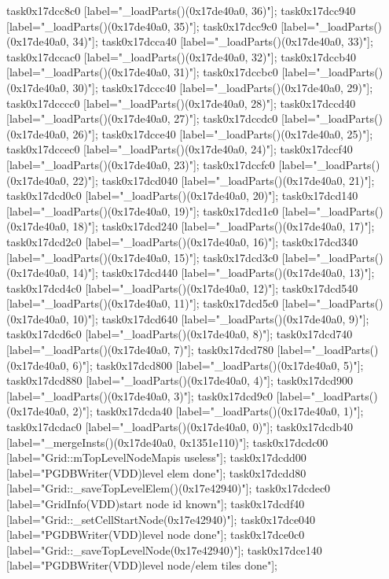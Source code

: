 {	task0x17dcc8c0 [label="_loadParts()(0x17de40a0, 36)"];
	task0x17dcc940 [label="_loadParts()(0x17de40a0, 35)"];
	task0x17dcc9c0 [label="_loadParts()(0x17de40a0, 34)"];
	task0x17dcca40 [label="_loadParts()(0x17de40a0, 33)"];
	task0x17dccac0 [label="_loadParts()(0x17de40a0, 32)"];
	task0x17dccb40 [label="_loadParts()(0x17de40a0, 31)"];
	task0x17dccbc0 [label="_loadParts()(0x17de40a0, 30)"];
	task0x17dccc40 [label="_loadParts()(0x17de40a0, 29)"];
	task0x17dcccc0 [label="_loadParts()(0x17de40a0, 28)"];
	task0x17dccd40 [label="_loadParts()(0x17de40a0, 27)"];
	task0x17dccdc0 [label="_loadParts()(0x17de40a0, 26)"];
	task0x17dcce40 [label="_loadParts()(0x17de40a0, 25)"];
	task0x17dccec0 [label="_loadParts()(0x17de40a0, 24)"];
	task0x17dccf40 [label="_loadParts()(0x17de40a0, 23)"];
	task0x17dccfc0 [label="_loadParts()(0x17de40a0, 22)"];
	task0x17dcd040 [label="_loadParts()(0x17de40a0, 21)"];
	task0x17dcd0c0 [label="_loadParts()(0x17de40a0, 20)"];
	task0x17dcd140 [label="_loadParts()(0x17de40a0, 19)"];
	task0x17dcd1c0 [label="_loadParts()(0x17de40a0, 18)"];
	task0x17dcd240 [label="_loadParts()(0x17de40a0, 17)"];
	task0x17dcd2c0 [label="_loadParts()(0x17de40a0, 16)"];
	task0x17dcd340 [label="_loadParts()(0x17de40a0, 15)"];
	task0x17dcd3c0 [label="_loadParts()(0x17de40a0, 14)"];
	task0x17dcd440 [label="_loadParts()(0x17de40a0, 13)"];
	task0x17dcd4c0 [label="_loadParts()(0x17de40a0, 12)"];
	task0x17dcd540 [label="_loadParts()(0x17de40a0, 11)"];
	task0x17dcd5c0 [label="_loadParts()(0x17de40a0, 10)"];
	task0x17dcd640 [label="_loadParts()(0x17de40a0, 9)"];
	task0x17dcd6c0 [label="_loadParts()(0x17de40a0, 8)"];
	task0x17dcd740 [label="_loadParts()(0x17de40a0, 7)"];
	task0x17dcd780 [label="_loadParts()(0x17de40a0, 6)"];
	task0x17dcd800 [label="_loadParts()(0x17de40a0, 5)"];
	task0x17dcd880 [label="_loadParts()(0x17de40a0, 4)"];
	task0x17dcd900 [label="_loadParts()(0x17de40a0, 3)"];
	task0x17dcd9c0 [label="_loadParts()(0x17de40a0, 2)"];
	task0x17dcda40 [label="_loadParts()(0x17de40a0, 1)"];
	task0x17dcdac0 [label="_loadParts()(0x17de40a0, 0)"];
	task0x17dcdb40 [label="_mergeInsts()(0x17de40a0, 0x1351e110)"];
	task0x17dcdc00 [label="Grid::mTopLevelNodeMap\nVDD is useless"];
	task0x17dcdd00 [label="PGDBWriter(VDD)\nTop level elem done"];
	task0x17dcdd80 [label="Grid::_saveTopLevelElem()(0x17e42940)"];
	task0x17dcdec0 [label="GridInfo(VDD)\nCell start node id known"];
	task0x17dcdf40 [label="Grid::_setCellStartNode(0x17e42940)"];
	task0x17dce040 [label="PGDBWriter(VDD)\nTop level node done"];
	task0x17dce0c0 [label="Grid::_saveTopLevelNode(0x17e42940)"];
	task0x17dce140 [label="PGDBWriter(VDD)\nTop level node/elem tiles done"];
}
